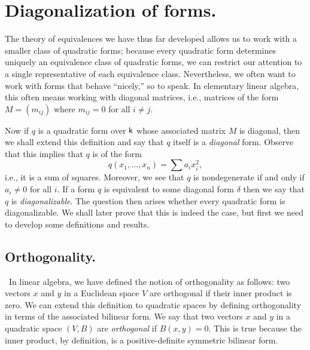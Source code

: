
\section{Diagonalization of forms.}

The theory of equivalences we have thus far developed allows us to work with a smaller class of quadratic forms; because every quadratic form determines uniquely an equivalence class of quadratic forms, we can restrict our attention to a single representative of each equivalence class. Nevertheless, we often want to work with forms that behave ``nicely,'' so to speak. In elementary linear algebra, this often means working with diagonal matrices, i.e., matrices of the form \(M = (m_{ij})\) where \(m_{ij} = 0\) for all \(i \neq j\).

Now if \(q\) is a quadratic form over \(\mathsf{k}\) whose associated matrix \(M\) is diagonal, then we shall extend this definition and say that \(q\) itself is a \emph{diagonal} form. Observe that this implies that \(q\) is of the form
\[
  q(x_1, \dots, x_n) = \sum a_i x_i^2,
\]
i.e., it is a sum of squares. Moreover, we see that \(q\) is nondegenerate if and only if \(a_i \neq 0\) for all \(i\). If a form \(q\) is equivalent to some diagonal form \(\delta\) then we say that \(q\) is \emph{diagonalizable}. The question then arises whether every quadratic form is diagonalizable. We shall later prove that this is indeed the case, but first we need to develop some definitions and results.

\subsection{Orthogonality.}~In linear algebra, we have defined the notion of orthogonality as follows: two vectors \(x\) and \(y\) in a Euclidean space \(V\) are orthogonal if their inner product is zero. We can extend this definition to quadratic spaces by defining orthogonality in terms of the associated bilinear form. We say that two vectors \(x\) and \(y\) in a quadratic space \((V, B)\) are \emph{orthogonal} if \(B(x, y) = 0\). This is true because the inner product, by definition, is a positive-definite symmetric bilinear form.\label{sec:orthogonality}

